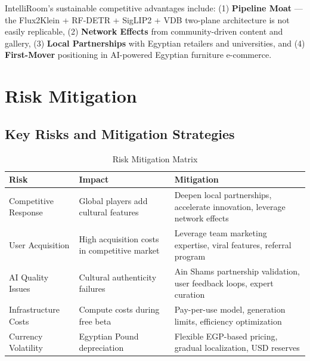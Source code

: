 IntelliRoom's sustainable competitive advantages include: (1) \textbf{Pipeline Moat} --- the Flux2Klein + RF-DETR + SigLIP2 + VDB two-plane architecture is not easily replicable, (2) \textbf{Network Effects} from community-driven content and gallery, (3) \textbf{Local Partnerships} with Egyptian retailers and universities, and (4) \textbf{First-Mover} positioning in AI-powered Egyptian furniture e-commerce.

\section{Risk Mitigation}
\label{sec:app_risk}

\subsection{Key Risks and Mitigation Strategies}

\begin{table}[h]
\centering
\caption{Risk Mitigation Matrix}
\label{tab:risk_mitigation}
\begin{tabular}{p{3cm}p{5cm}p{5cm}}
\toprule
\textbf{Risk} & \textbf{Impact} & \textbf{Mitigation} \\
\midrule
Competitive Response & Global players add cultural features & Deepen local partnerships, accelerate innovation, leverage network effects \\
\midrule
User Acquisition & High acquisition costs in competitive market & Leverage team marketing expertise, viral features, referral program \\
\midrule
AI Quality Issues & Cultural authenticity failures & Ain Shams partnership validation, user feedback loops, expert curation \\
\midrule
Infrastructure Costs & Compute costs during free beta & Pay-per-use model, generation limits, efficiency optimization \\
\midrule
Currency Volatility & Egyptian Pound depreciation & Flexible EGP-based pricing, gradual localization, USD reserves \\
\bottomrule
\end{tabular}
\end{table}

